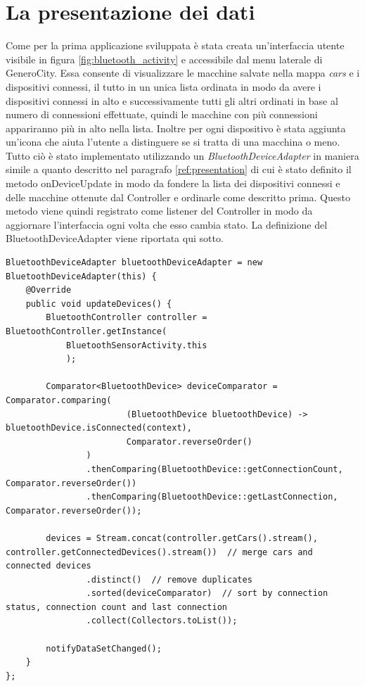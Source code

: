 \section{La presentazione dei dati}
Come per la prima applicazione sviluppata è stata creata un'interfaccia utente visibile in figura \ref{fig:bluetooth_activity} e accessibile dal menu laterale di GeneroCity. Essa consente di visualizzare le macchine salvate nella mappa \textit{cars} e i dispositivi connessi, il tutto in un unica lista ordinata in modo da avere i dispositivi connessi in alto e successivamente tutti gli altri ordinati in base al numero di connessioni effettuate, quindi le macchine con più connessioni appariranno più in alto nella lista. Inoltre per ogni dispositivo è stata aggiunta un'icona che aiuta l'utente a distinguere se si tratta di una macchina o meno. Tutto ciò è stato implementato utilizzando un \textit{BluetoothDeviceAdapter} in maniera simile a quanto descritto nel paragrafo \ref{ref:presentation} di cui è stato definito il metodo onDeviceUpdate in modo da fondere la lista dei dispositivi connessi e delle macchine ottenute dal Controller e ordinarle come descritto prima. Questo metodo viene quindi registrato come listener del Controller in modo da aggiornare l'interfaccia ogni volta che esso cambia stato. La definizione del BluetoothDeviceAdapter viene riportata qui sotto.
\begin{verbatim}
BluetoothDeviceAdapter bluetoothDeviceAdapter = new BluetoothDeviceAdapter(this) {
    @Override
    public void updateDevices() {
        BluetoothController controller = BluetoothController.getInstance(
            BluetoothSensorActivity.this
            );

        Comparator<BluetoothDevice> deviceComparator = Comparator.comparing(
                        (BluetoothDevice bluetoothDevice) -> bluetoothDevice.isConnected(context),
                        Comparator.reverseOrder()
                )
                .thenComparing(BluetoothDevice::getConnectionCount, Comparator.reverseOrder())
                .thenComparing(BluetoothDevice::getLastConnection, Comparator.reverseOrder());

        devices = Stream.concat(controller.getCars().stream(), controller.getConnectedDevices().stream())  // merge cars and connected devices
                .distinct()  // remove duplicates
                .sorted(deviceComparator)  // sort by connection status, connection count and last connection
                .collect(Collectors.toList());

        notifyDataSetChanged();
    }
};
\end{verbatim}


